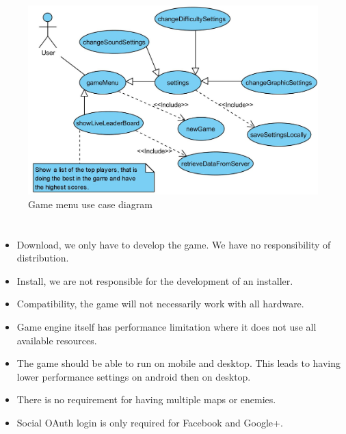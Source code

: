 \documentclass[letterpaper]{article}
\begin{document}
		\vspace{0.2in}
		
		\begin{figure}[H]
		\centering
		\includegraphics[width=180mm]{game_menu}
		\caption{Game menu use case diagram}
		\label{overflow}
		\end{figure}
		
		\section*{\colorbox{blue}{}} 
		\vspace{0.2in}
		
		\begin{itemize}
  		\item Download, we only have to develop the game. We have no responsibility of distribution.
  		\item Install, we are not responsible for the development of an installer.
  		\item Compatibility, the game will not necessarily work with all hardware.
  		\item Game engine itself has performance limitation where it does not use all available resources.
  		\item The game should be able to run on mobile and desktop. This leads to having lower performance settings on android then on desktop.
  		\item There is no requirement for having multiple maps or enemies.
  		\item Social OAuth login is only required for Facebook and Google+.
		\end{itemize}
		
\end{document}
